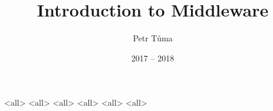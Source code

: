 %

\title[Introduction to Middleware]{Introduction to Middleware}
\author{Petr Tůma}
\date{2017 -- 2018}


  \frame{\titlepage}
  \tableofcontents

  \mode<all>{}
  \mode<all>{}
  \mode<all>{}
  \mode<all>{}
  \mode<all>{}
  \mode<all>{}

